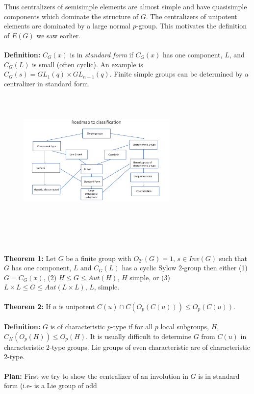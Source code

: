 Thus centralizers of semisimple elements are almost simple and have quasisimple components which
dominate the structure of $G$.  The centralizers of unipotent elements are dominated by a large 
normal $p$-group.  This motivates the definition of $E(G)$ we saw earlier.\\
\\
{\bf Definition:} $C_G(x)$ is in \emph{standard form} if $C_G(x)$ has one component, $L$, and $C_G(L)$ is small (often cyclic).
An example is $C_G(s)= GL_1(q) \times GL_{n-1}(q)$.  Finite simple groups can be determined by a centralizer in standard
form.
\begin{figure}
\center
\includegraphics[width=0.7\textwidth,natwidth=642,natheight=610, height=70mm, width=80mm]{classificationroadmap.pdf}
\end{figure}
\\
\\
{\bf Theorem 1:} Let $G$ be a finite group with $O_{2'}(G)=1$, $s \in Inv(G)$ such that $G$ has one component, $L$
and $C_G(L)$ has a cyclic Sylow $2$-group then either (1) $G=C_G(x)$, (2) $H \leq G \leq Aut(H)$, $H$ simple, or (3)
$L \times L \leq G \leq Aut(L \times L)$, $L$, simple.
\\
\\
{\bf Theorem 2:} If $u$ is unipotent $C(u) \cap C(O_p(C(u))) \leq O_p(C(u))$.
\\
\\
{\bf Definition:} $G$ is of characteristic $p$-type if for all $p$ local subgroups, $H$, $C_H(O_p(H)) \leq O_p(H)$.
It is usually difficult to determine $G$ from $C(u)$ in characteristic $2$-type groups.  Lie groups of even characteristic
are of characteristic $2$-type.
\\
\\
{\bf Plan:} First we try to show the centralizer of an involution in $G$ is in standard form (i.e- is a Lie group of odd
